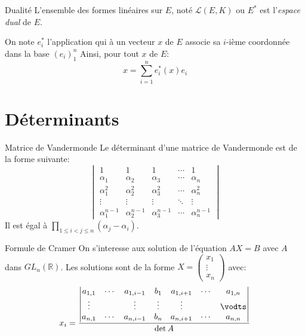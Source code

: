 \documentclass[french, a4paper, 11pt, twocolumn]{article}
\newcommand{\R}{\mathbb{R}}   %
\begin{document}
\begin{theoreme}{Dualité}
  L'ensemble des formes linéaires sur $E$, noté $\mathcal L(E, K)$ ou $E^{*}$ est l'\emph{espace dual} de $E$.

  On note $e_{i}^{*}$ l'application qui à un vecteur $x$ de $E$ associe sa $i$-ième coordonnée dans la base $(e_{i})_{1}^{n}$
  Ainsi, pour tout $x$ de $E$:
  \[x = \sum_{i=1}^n e_{i}^{*}(x)e_{i}\]
\end{theoreme}

\section{Déterminants}
\begin{theoreme}{Matrice de Vandermonde}
  Le déterminant d'une matrice de Vandermonde est de la forme suivante:
  \[\begin{vmatrix}
      1                & 1                & 1                & \cdots & 1              \\
      \alpha_{1}       & \alpha_{2}       & \alpha_{3}       & \cdots & \alpha_{n}     \\
      \alpha_{1}^{2}   & \alpha_{2}^{2}   & \alpha_{3}^{2}   & \cdots & \alpha_{n}^{2} \\
      \vdots           & \vdots           & \vdots           & \ddots & \vdots         \\
      \alpha_{1}^{n-1} & \alpha_{2}^{n-1} & \alpha_{3}^{n-1} & \cdots & \alpha_{n}^{n-1}
    \end{vmatrix}\]
  Il est égal à $\prod\limits_{1\leqslant i < j \leqslant n}(\alpha_{j}-\alpha_{i})$.
\end{theoreme}

\begin{theoreme}{Formule de Cramer}
  On s'interesse aux solution de l'équation $AX=B$ avec $A$ dans $GL_{n}(\R)$.
  Les solutions sont de la forme $X = \begin{pmatrix}x_{1}                   \\ \vdots\\ x_{n}\end{pmatrix}$ avec:
  \[x_{i} = \dfrac{
      \begin{vmatrix}
        a_{1,1} & \cdots & a_{1,i-1} & b_{1}  & a_{1,i+1} & \cdots & a_{1,n} \\
        \vdots  &        & \vdots    & \vdots & \vdots    &        & \vodts  \\
        a_{n,1} & \cdots & a_{n,i-1} & b_{n}  & a_{n,i+1} & \cdots & a_{n,n}
      \end{vmatrix}}{\det A}\]
\end{theoreme}
\end{document}
